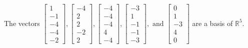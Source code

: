 \begin{exercise}
\begin{exerciseStatement}
  \end{exerciseStatement}
  \begin{exerciseAnswer}
   The vectors \(\left[\begin{array}{r}
1 \\
-1 \\
-4 \\
-4 \\
-2
\end{array}\right] , \left[\begin{array}{r}
-4 \\
2 \\
2 \\
-2 \\
2
\end{array}\right] , \left[\begin{array}{r}
-4 \\
-4 \\
-4 \\
4 \\
-4
\end{array}\right] , \left[\begin{array}{r}
-3 \\
1 \\
-1 \\
-1 \\
-3
\end{array}\right] , \text{ and } \left[\begin{array}{r}
0 \\
1 \\
-3 \\
4 \\
0
\end{array}\right]\) 
  	 are  a basis of \(\mathbb{R}^5\).
  


  \end{exerciseAnswer}
\end{exercise}